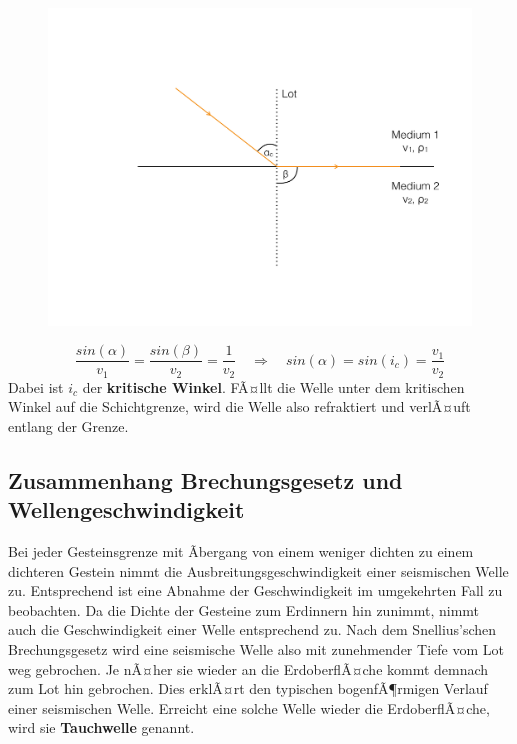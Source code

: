 \begin{figure}[H]
	\centering
	\includegraphics[width = \textwidth]{SeismikBilder/Refraktion}
\end{figure}

\begin{equation*}
	\frac{sin(\alpha)}{v_1} = \frac{sin(\beta)}{v_2} = \frac{1}{v_2} \quad \Rightarrow \quad sin(\alpha) = sin(i_c) = \frac{v_1}{v_2}
\end{equation*}
Dabei ist $i_c$ der \textbf{kritische Winkel}. FÃ¤llt die Welle unter dem kritischen Winkel auf die Schichtgrenze, wird die Welle also refraktiert und verlÃ¤uft entlang der Grenze.


\subsection{Zusammenhang Brechungsgesetz und Wellengeschwindigkeit}
Bei jeder Gesteinsgrenze mit Ãbergang von einem weniger dichten zu einem dichteren Gestein nimmt die Ausbreitungsgeschwindigkeit einer seismischen Welle zu. Entsprechend ist eine Abnahme der Geschwindigkeit im umgekehrten Fall zu beobachten. Da die Dichte der Gesteine zum Erdinnern hin zunimmt, nimmt auch die Geschwindigkeit einer Welle entsprechend zu. Nach dem Snellius'schen Brechungsgesetz wird eine seismische Welle also mit zunehmender Tiefe vom Lot weg gebrochen. Je nÃ¤her sie wieder an die ErdoberflÃ¤che kommt demnach zum Lot hin gebrochen. Dies erklÃ¤rt den typischen bogenfÃ¶rmigen Verlauf einer seismischen Welle. Erreicht eine solche Welle wieder die ErdoberflÃ¤che, wird sie \textbf{Tauchwelle} genannt.


